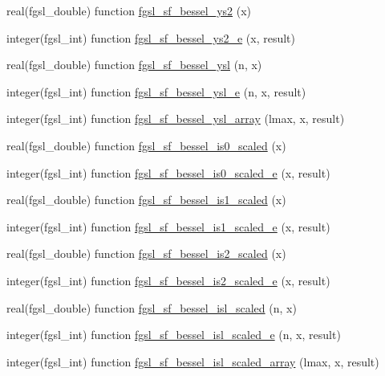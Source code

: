 \begin{DoxyCompactItemize}
\item 
real(fgsl\+\_\+double) function \hyperlink{specfunc_8finc_aa420c0082944ca91380fff36accdca85}{fgsl\+\_\+sf\+\_\+bessel\+\_\+ys2} (x)
\item 
integer(fgsl\+\_\+int) function \hyperlink{specfunc_8finc_a5a4e5351a849979f0d4b854bfe7bcbc9}{fgsl\+\_\+sf\+\_\+bessel\+\_\+ys2\+\_\+e} (x, result)
\item 
real(fgsl\+\_\+double) function \hyperlink{specfunc_8finc_acea044354e5de5f02815d2246cd4661d}{fgsl\+\_\+sf\+\_\+bessel\+\_\+ysl} (n, x)
\item 
integer(fgsl\+\_\+int) function \hyperlink{specfunc_8finc_accca890e7731268378117d252770985f}{fgsl\+\_\+sf\+\_\+bessel\+\_\+ysl\+\_\+e} (n, x, result)
\item 
integer(fgsl\+\_\+int) function \hyperlink{specfunc_8finc_a32a304d26cfd3ed3f115177ca8c4fc00}{fgsl\+\_\+sf\+\_\+bessel\+\_\+ysl\+\_\+array} (lmax, x, result)
\item 
real(fgsl\+\_\+double) function \hyperlink{specfunc_8finc_aefdf46b4b529a2c3c7ff2aea4b9ef39c}{fgsl\+\_\+sf\+\_\+bessel\+\_\+is0\+\_\+scaled} (x)
\item 
integer(fgsl\+\_\+int) function \hyperlink{specfunc_8finc_a5315a6bcb6ea338e48f5d2e456ec6ae5}{fgsl\+\_\+sf\+\_\+bessel\+\_\+is0\+\_\+scaled\+\_\+e} (x, result)
\item 
real(fgsl\+\_\+double) function \hyperlink{specfunc_8finc_a75591023377883b34dd97a83636987e2}{fgsl\+\_\+sf\+\_\+bessel\+\_\+is1\+\_\+scaled} (x)
\item 
integer(fgsl\+\_\+int) function \hyperlink{specfunc_8finc_a6cd23bcdbd5e162709e2105bd6a414f6}{fgsl\+\_\+sf\+\_\+bessel\+\_\+is1\+\_\+scaled\+\_\+e} (x, result)
\item 
real(fgsl\+\_\+double) function \hyperlink{specfunc_8finc_a310d2b10adf86bea7021155aac2cd80c}{fgsl\+\_\+sf\+\_\+bessel\+\_\+is2\+\_\+scaled} (x)
\item 
integer(fgsl\+\_\+int) function \hyperlink{specfunc_8finc_afcc428b9c5d6acc160b6b0fc6d66f795}{fgsl\+\_\+sf\+\_\+bessel\+\_\+is2\+\_\+scaled\+\_\+e} (x, result)
\item 
real(fgsl\+\_\+double) function \hyperlink{specfunc_8finc_a60d2720c3bf8d9771830e29a7899a67c}{fgsl\+\_\+sf\+\_\+bessel\+\_\+isl\+\_\+scaled} (n, x)
\item 
integer(fgsl\+\_\+int) function \hyperlink{specfunc_8finc_a4fe4e94f17df4a2711bcfe8c6f4d9bd9}{fgsl\+\_\+sf\+\_\+bessel\+\_\+isl\+\_\+scaled\+\_\+e} (n, x, result)
\item 
integer(fgsl\+\_\+int) function \hyperlink{specfunc_8finc_af82f9a0bceb2a20163ad54dff5c36239}{fgsl\+\_\+sf\+\_\+bessel\+\_\+isl\+\_\+scaled\+\_\+array} (lmax, x, result)

\end{DoxyCompactItemize}
